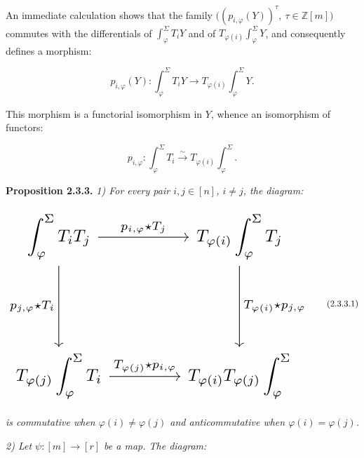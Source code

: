%
An immediate calculation shows that the family
$\bigl((p_{i,\varphi}(Y))^\tau,\ \tau\in\mathbb Z[m]\bigr)$ commutes
with the differentials of $\int_\varphi^\Sigma T_iY$ and of
$T_{\varphi(i)}\int_\varphi^\Sigma Y$, and consequently defines a
morphism:

\begin{equation}
  p_{i,\varphi}(Y)\colon
  \int_\varphi^\Sigma T_iY
  \longrightarrow
  T_{\varphi(i)}\int_\varphi^\Sigma Y.
  \tag{2.3.2.2}
\end{equation}

This morphism is a functorial isomorphism in $Y$, whence an isomorphism
of functors:

\begin{equation}
  p_{i,\varphi}\colon
  \int_\varphi^\Sigma T_i
  \xrightarrow{\ \sim\ }
  T_{\varphi(i)}\int_\varphi^\Sigma.
  \tag{2.3.2.3}
\end{equation}

\noindent\textbf{Proposition 2.3.3.}\quad
\emph{1) For every pair $i,j\in[n]$, $i\ne j$, the diagram:}

\begin{equation}
  \resizebox{\textwidth}{!}{%
    $\begin{tikzcd}[ampersand replacement=\&,column sep=4.2em,row sep=4.8em]
      \displaystyle\int_\varphi^\Sigma T_iT_j
        \arrow[r,"{p_{i,\varphi}\star T_j}"]
        \arrow[d,"{p_{j,\varphi}\star T_i}"']
        \& \displaystyle T_{\varphi(i)}\int_\varphi^\Sigma T_j
          \arrow[d,"{T_{\varphi(i)}\star p_{j,\varphi}}"] \\
      \displaystyle T_{\varphi(j)}\int_\varphi^\Sigma T_i
        \arrow[r,"{T_{\varphi(j)}\star p_{i,\varphi}}"]
        \& \displaystyle T_{\varphi(i)}T_{\varphi(j)}\int_\varphi^\Sigma
    \end{tikzcd}$%
  }
  \tag{2.3.3.1}
\end{equation}

\emph{is commutative when $\varphi(i)\ne\varphi(j)$ and
anticommutative when $\varphi(i)=\varphi(j)$.}

\emph{2) Let $\psi\colon[m]\longrightarrow[r]$ be a map. The diagram:}

